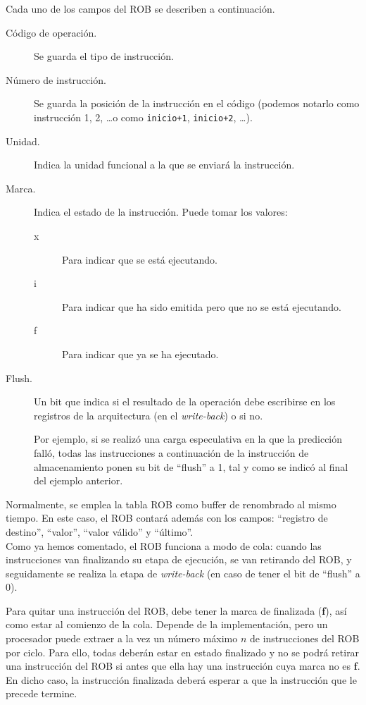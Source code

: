 Cada uno de los campos del ROB se describen a continuación.
\begin{description}
    \item [Código de operación.] Se guarda el tipo de instrucción.
    \item [Número de instrucción.] Se guarda la posición de la instrucción en el código (podemos notarlo como instrucción 1, 2, \ldots o como \verb|inicio+1|, \verb|inicio+2|, \ldots).
    \item [Unidad.] Indica la unidad funcional a la que se enviará la instrucción.
    \item [Marca.] Indica el estado de la instrucción. Puede tomar los valores:
        \begin{description}
            \item [x] Para indicar que se está ejecutando.
            \item [i] Para indicar que ha sido emitida pero que no se está ejecutando.
            \item [f] Para indicar que ya se ha ejecutado.
        \end{description}
    \item [Flush.] Un bit que indica si el resultado de la operación debe escribirse en los registros de la arquitectura (en el \emph{write-back}) o si no.

        Por ejemplo, si se realizó una carga especulativa en la que la predicción falló, todas las instrucciones a continuación de la instrucción de almacenamiento ponen su bit de ``flush'' a 1, tal y como se indicó al final del ejemplo anterior.
\end{description}
Normalmente, se emplea la tabla ROB como buffer de renombrado al mismo tiempo. En este caso, el ROB contará además con los campos: ``registro de destino'', ``valor'', ``valor válido'' y ``último''.\\

Como ya hemos comentado, el ROB funciona a modo de cola: cuando las instrucciones van finalizando su etapa de ejecución, se van retirando del ROB, y seguidamente se realiza la etapa de \emph{write-back} (en caso de tener el bit de ``flush'' a 0).

Para quitar una instrucción del ROB, debe tener la marca de finalizada (\textbf{f}), así como estar al comienzo de la cola. Depende de la implementación, pero un procesador puede extraer a la vez un número máximo $n$ de instrucciones del ROB por ciclo. Para ello, todas deberán estar en estado finalizado y no se podrá retirar una instrucción del ROB si antes que ella hay una instrucción cuya marca no es \textbf{f}. En dicho caso, la instrucción finalizada deberá esperar a que la instrucción que le precede termine.

